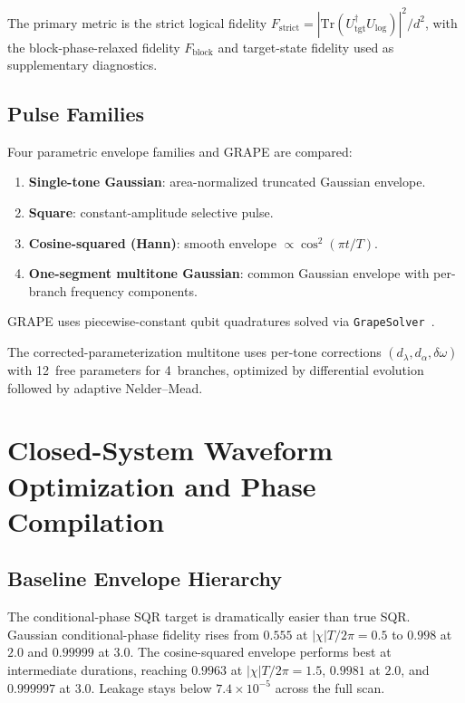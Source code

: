 \documentclass[aps,pra,twocolumn,reprint,amsmath,amssymb]{revtex4-2}
\begin{document}
The primary metric is the strict logical fidelity $F_\mathrm{strict} = |\mathrm{Tr}(U_\mathrm{tgt}^\dagger U_\mathrm{log})|^2/d^2$, with the block-phase-relaxed fidelity $F_\mathrm{block}$ and target-state fidelity used as supplementary diagnostics.

\subsection{Pulse Families}

Four parametric envelope families and GRAPE are compared:
\begin{enumerate}
\item \textbf{Single-tone Gaussian}: area-normalized truncated Gaussian envelope.
\item \textbf{Square}: constant-amplitude selective pulse.
\item \textbf{Cosine-squared (Hann)}: smooth envelope $\propto \cos^2(\pi t/T)$.
\item \textbf{One-segment multitone Gaussian}: common Gaussian envelope with per-branch frequency components.
\end{enumerate}
GRAPE uses piecewise-constant qubit quadratures solved via \texttt{GrapeSolver}~\cite{khaneja2005optimal}.

The corrected-parameterization multitone uses per-tone corrections $(d_\lambda, d_\alpha, \delta\omega)$ with 12~free parameters for 4~branches, optimized by differential evolution followed by adaptive Nelder--Mead.

\section{Closed-System Waveform Optimization and Phase Compilation}

\subsection{Baseline Envelope Hierarchy}

The conditional-phase SQR target is dramatically easier than true SQR. Gaussian conditional-phase fidelity rises from $0.555$ at $|\chi|T/2\pi=0.5$ to $0.998$ at $2.0$ and $0.99999$ at $3.0$. The cosine-squared envelope performs best at intermediate durations, reaching $0.9963$ at $|\chi|T/2\pi=1.5$, $0.9981$ at $2.0$, and $0.999997$ at $3.0$. Leakage stays below $7.4\times 10^{-5}$ across the full scan.
\end{document}
